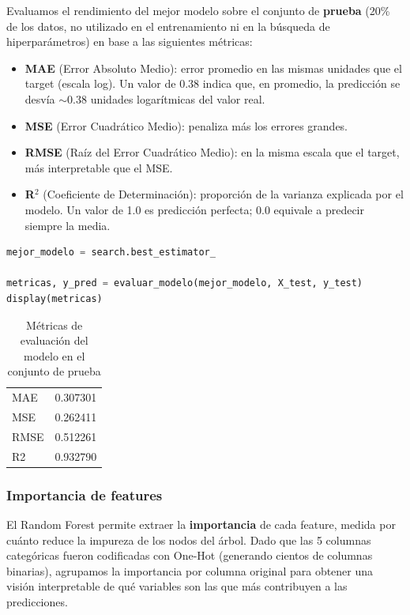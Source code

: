 Evaluamos el rendimiento del mejor modelo sobre el conjunto de \textbf{prueba} (20\% de los datos, no
utilizado en el entrenamiento ni en la búsqueda de hiperparámetros) en base a las siguientes métricas:

\begin{itemize}
  \item \textbf{MAE} (Error Absoluto Medio): error promedio en las mismas unidades que el target (escala log). Un
  valor de 0.38 indica que, en promedio, la predicción se desvía $\sim$0.38 unidades logarítmicas del valor real.
  \item \textbf{MSE} (Error Cuadrático Medio): penaliza más los errores grandes.
  \item \textbf{RMSE} (Raíz del Error Cuadrático Medio): en la misma escala que el target, más interpretable que el MSE.
  \item \textbf{R$^2$} (Coeficiente de Determinación): proporción de la varianza explicada por el modelo. Un valor de
  1.0 es predicción perfecta; 0.0 equivale a predecir siempre la media.
\end{itemize}

\begin{lstlisting}[language=Python, caption={Evaluación del modelo en el conjunto de prueba}, label={lst:evaluacion-modelo}]
mejor_modelo = search.best_estimator_

metricas, y_pred = evaluar_modelo(mejor_modelo, X_test, y_test)
display(metricas)
\end{lstlisting}

\begin{table}[ht]
  \centering
  \caption{Métricas de evaluación del modelo en el conjunto de prueba}
    \begin{tabular}{l l}
      \hline
      MAE & 0.307301\\
      MSE & 0.262411\\
      RMSE & 0.512261\\
      R2 & 0.932790\\
      \hline
    \end{tabular}
  \label{tab:metricas-evaluacion}
\end{table}

\subsubsection{Importancia de features}

El Random Forest permite extraer la \textbf{importancia} de cada feature, medida por cuánto reduce la impureza
de los nodos del árbol. Dado que las 5 columnas categóricas fueron codificadas con One-Hot (generando cientos
de columnas binarias), agrupamos la importancia por columna original para obtener una visión interpretable de
qué variables son las que más contribuyen a las predicciones.

